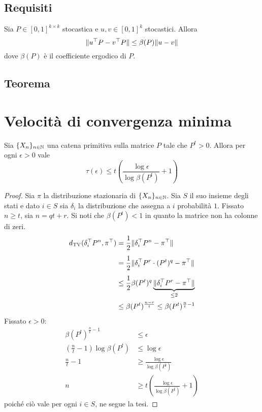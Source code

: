 \subsection{Requisiti}
\begin{lemma}[di contrazione]\label{lemma:contra}
	Sia $P\in[0,1]^{k\times k}$ stocastica e $u,v\in[0,1]^k$ stocastici. Allora
	\begin{equation*}
		\|u^\top P-v^\top P\| \le \beta(P)\|u-v\|
	\end{equation*}
	dove $\beta(P)$ è il coefficiente ergodico di $P$.
\end{lemma}


\subsection{Teorema}
\section{Velocità di convergenza minima}
\begin{thm}
	Sia $\{X_n\}_{n\in\mathbb N}$ una catena primitiva sulla matrice $P$ tale che $P^t>0$. Allora per ogni $\epsilon>0$ vale
	\begin{equation*}
		\tau(\epsilon)\le t\left(\frac{\log\epsilon}{\log\beta(P^t)}+1\right)
	\end{equation*}
\end{thm}
\begin{proof}
	Sia $\pi$ la distribuzione stazionaria di $\{X_n\}_{n\in\mathbb N}$. Sia $S$ il suo insieme degli stati e dato $i\in S$ sia $\delta_i$ la distribuzione che assegna a $i$ probabilità $1$. Fissato $n\ge t$, sia $n=qt+r$. Si noti che $\beta(P^t)<1$ in quanto la matrice non ha colonne di zeri.
	\begin{align*}
		d_{\mathrm{TV}}(\delta_i^\top P^n,\pi^\top) & = \frac12\|\delta_i^\top P^n-\pi^\top\|                                   \\[1ex]
		                               & = \frac12\|\delta_i^\top P^r\cdot (P^t)^q-\pi^\top\|                      \\[1ex]
		                               & \le \frac12\beta(P^t)^q\underbrace{\|\delta_i^\top P^r-\pi^\top\|}_{\le2} \\
		                               & \le \beta(P^t)^{\frac{n-r}{t}} \le \beta(P^t)^{\frac n t -1}
	\end{align*}
	Fissato $\epsilon>0$:
	\begin{align*}
		\beta(P^t)^{\frac n t -1}             & \le \epsilon                                            \\
		\left(\frac nt-1\right)\log\beta(P^t) & \le \log\epsilon                                        \\
		\frac nt-1                            & \ge \frac{\log\epsilon}{\log\beta(P^t)}                 \\
		n                                     & \ge t\left(\frac{\log\epsilon}{\log\beta(P^t)}+1\right)
	\end{align*}
	poiché ciò vale per ogni $i\in S$, ne segue la tesi.
\end{proof}
